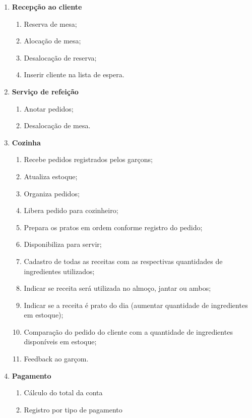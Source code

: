 \begin{enumerate}


\item \textbf{Recepção ao cliente}

\begin{enumerate}
  \item Reserva de mesa;
  \item Alocação de mesa;
  \item Desalocação de reserva;
  \item Inserir cliente na lista de espera.
\end{enumerate}

\item \textbf{Serviço de refeição}

\begin{enumerate}
  \item Anotar pedidos;
  \item Desalocação de mesa.
\end{enumerate}


\item \textbf{Cozinha}

\begin{enumerate}

  \item Recebe pedidos registrados pelos garçons;
  \item Atualiza estoque;
  \item Organiza pedidos;
  \item Libera pedido para cozinheiro;
  \item Prepara os pratos em ordem conforme registro do pedido;
  \item Disponibiliza para servir;
  \item Cadastro de todas as receitas com as respectivas quantidades de ingredientes utilizados;
  \item Indicar se receita será utilizada no almoço, jantar ou ambos;
  \item Indicar se a receita é prato do dia (aumentar quantidade de ingredientes em estoque);
  \item Comparação do pedido do cliente com a quantidade de ingredientes disponíveis em estoque;
  \item Feedback ao garçom.
\end{enumerate}

\item \textbf{Pagamento}

\begin{enumerate}
  \item Cálculo do total da conta
  \item Registro por tipo de pagamento
\end{enumerate}


\end{enumerate}
